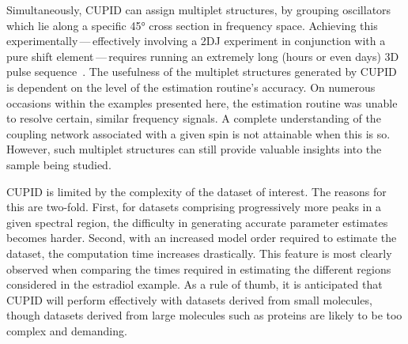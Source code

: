 Simultaneously, \ac{CUPID} can assign multiplet structures,
by grouping oscillators which lie along a specific \ang{45} cross section in
frequency space. Achieving this experimentally\,---\,effectively involving
a \ac{2DJ} experiment in conjunction with a pure shift element\,---\,requires
running an extremely long (hours or even days) \ac{3D} pulse
sequence~\cite{Kiraly2017}. The
usefulness of the multiplet structures generated by \ac{CUPID} is dependent on
the level of the estimation routine's accuracy. On
numerous occasions within the examples presented here, the estimation routine
was unable to resolve certain, similar frequency signals. A complete
understanding of the coupling network associated with a given spin is not
attainable when this is so. However, such multiplet structures can still provide
valuable insights into the sample being studied.

\ac{CUPID} is limited by the complexity of the dataset of interest. The reasons
for this are two-fold. First, for datasets comprising progressively more peaks
in a given spectral region, the difficulty in generating accurate parameter
estimates becomes harder. Second, with an increased model order required to
estimate the dataset, the computation time increases drastically.
This feature is most clearly observed when comparing the times required in
estimating the different regions considered in the estradiol example. As a rule
of thumb, it is anticipated that \ac{CUPID} will perform effectively with datasets
derived from small molecules, though datasets derived from large molecules such
as proteins are likely to be too complex and demanding.
